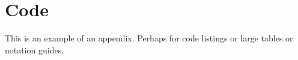 \chapter{Code}

This is an example of an appendix. Perhaps for code listings or large tables or
notation guides.
